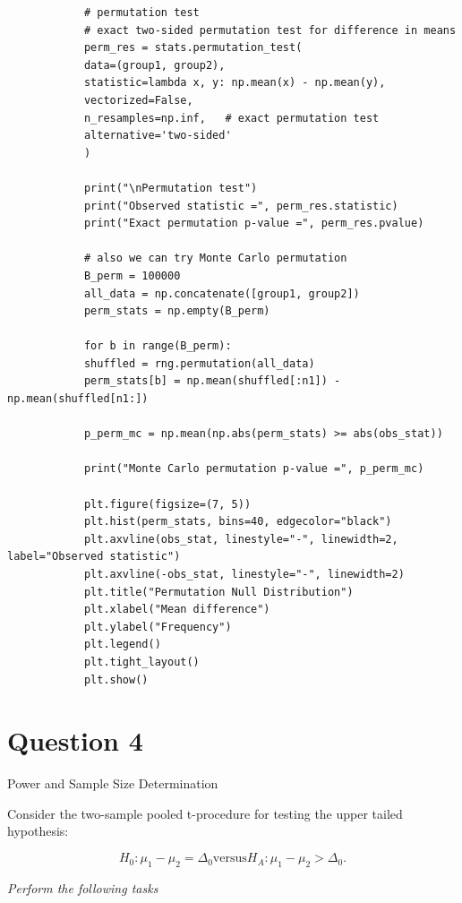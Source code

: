 \documentclass[letterpaper]{article}
\begin{document}
		\begin{lstlisting}
			# permutation test
			# exact two-sided permutation test for difference in means
			perm_res = stats.permutation_test(
			data=(group1, group2),
			statistic=lambda x, y: np.mean(x) - np.mean(y),
			vectorized=False,
			n_resamples=np.inf,   # exact permutation test
			alternative='two-sided'
			)
			
			print("\nPermutation test")
			print("Observed statistic =", perm_res.statistic)
			print("Exact permutation p-value =", perm_res.pvalue)
			
			# also we can try Monte Carlo permutation
			B_perm = 100000
			all_data = np.concatenate([group1, group2])
			perm_stats = np.empty(B_perm)
			
			for b in range(B_perm):
			shuffled = rng.permutation(all_data)
			perm_stats[b] = np.mean(shuffled[:n1]) - np.mean(shuffled[n1:])
			
			p_perm_mc = np.mean(np.abs(perm_stats) >= abs(obs_stat))
			
			print("Monte Carlo permutation p-value =", p_perm_mc)
			
			plt.figure(figsize=(7, 5))
			plt.hist(perm_stats, bins=40, edgecolor="black")
			plt.axvline(obs_stat, linestyle="-", linewidth=2, label="Observed statistic")
			plt.axvline(-obs_stat, linestyle="-", linewidth=2)
			plt.title("Permutation Null Distribution")
			plt.xlabel("Mean difference")
			plt.ylabel("Frequency")
			plt.legend()
			plt.tight_layout()
			plt.show()
		\end{lstlisting}
		
		\clearpage
		
		\section{Question 4}
		
		{\color{deepred} Power and Sample Size Determination}
		
		Consider the two-sample pooled t-procedure for testing the upper tailed hypothesis:
		
		\[
		H_0 : \mu_1 - \mu_2 = \Delta_0
		\text{versus} 
		H_A : \mu_1 - \mu_2 > \Delta_0.
		\]
		
		\medskip
		
		\emph{Perform the following tasks}
		
\end{document}

